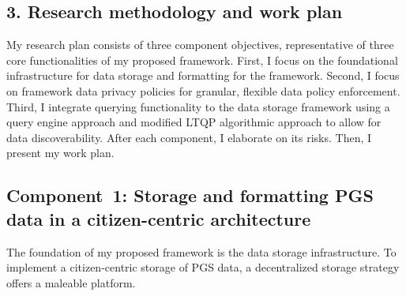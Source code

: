 \documentclass[a4paper,11pt]{article}
\begin{document}
\begin{refsection}
\newpage

\section{3. Research methodology and work plan}

\begin{comment}
\textit{Elaborate the different envisaged steps (experiments/activities) in your research, and motivate strategic choices in view of reaching the objectives. Describe the set-up and cohesion of the work packages including intermediate goals (milestones).
Show where the proposed methodology (research approach) is according to the state of the art and where it is novel. Discuss risks that might endanger reaching project objectives and the contingency plans to be put in place should this risk occur.
Use a table or graphic representation of the planned course of activities (timing work packages, milestones, critical path) over the 4-years grant period.}
\end{comment}

\medskip

\noindent
My research plan consists of three component objectives, representative of three core functionalities of my proposed framework.
%
First, I focus on the foundational infrastructure for data storage and formatting for the framework.
%
Second, I focus on framework data privacy policies for granular, flexible data policy enforcement.
%
Third, I integrate querying functionality to the data storage framework using a query engine approach and modified LTQP algorithmic approach to allow for data discoverability.
%
After each component, I elaborate on its risks.
Then, I present my work plan.

\newcommand\WPa{Storage and formatting PGS data in a citizen-centric architecture}
\subsection{Component~1: \WPa}

The foundation of my proposed framework is the data storage infrastructure.
To implement a citizen-centric storage of PGS data, a decentralized storage strategy offers a maleable platform.


\newcommand\WPaa{Storing PGS data in Solid data vaults}

\end{refsection}
\end{document}
